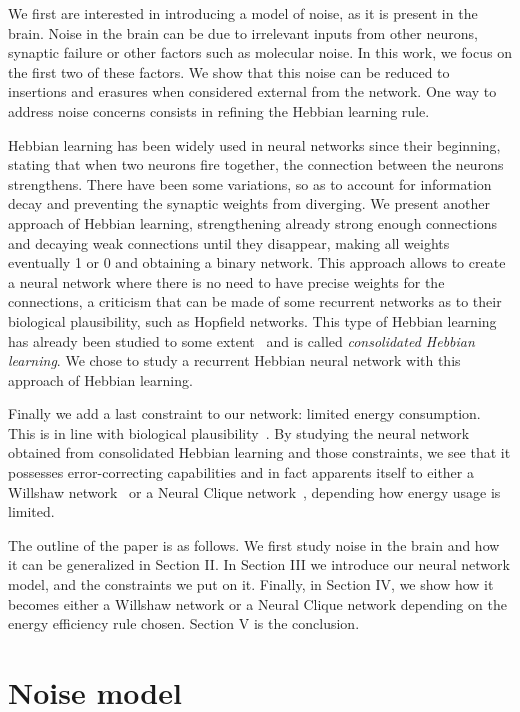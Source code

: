 \documentclass[journal]{IEEEtran}
\begin{document}
We first are interested in introducing a model of noise, as it is present in the brain. Noise in the brain can be due to irrelevant inputs from other neurons, synaptic failure or other factors such as molecular noise. In this work, we focus on the first two of these factors. We show that this noise can be reduced to insertions and erasures when considered external from the network. One way to address noise concerns consists in refining the Hebbian learning rule.

Hebbian learning has been widely used in neural networks since their beginning,
stating that when two neurons fire together, the connection between the neurons
strengthens. There have been some variations, so as to account for information
decay and preventing the synaptic weights from diverging. We present another
approach of Hebbian learning, strengthening already strong enough connections
and decaying weak connections until they disappear, making all weights
eventually 1 or 0 and obtaining a binary network. This approach allows to create a neural network where there is no need to have precise weights for the connections, a criticism that can be made of some recurrent networks as to their biological plausibility, such as Hopfield networks\cite{hopfield1982neural}. This type of Hebbian learning has already been studied to some extent~\cite{fusi2000spike,gerstner2002mathematical} and is called \emph{consolidated Hebbian learning}. We chose to study a recurrent Hebbian neural network with this approach of Hebbian learning.


Finally we add a last constraint to our network: limited energy consumption. This is in line with biological plausibility~\cite{attwell2001energy, lennie2003cost}. By studying the neural network obtained from consolidated Hebbian learning and those constraints, we see that it possesses error-correcting capabilities and in fact apparents itself to either a Willshaw network~\cite{willshaw1969non} or a Neural Clique network~\cite{gripon2011sparse}, depending how energy usage is limited.

 The outline of the paper is as follows. We first study noise in the brain and how it can be generalized in Section II. In Section III we introduce our neural network model, and the constraints we put on it. Finally, in Section IV, we show how it becomes either a Willshaw network or a Neural Clique network depending on the energy efficiency rule chosen. Section V is the conclusion.

\section{Noise model}
\end{document}

